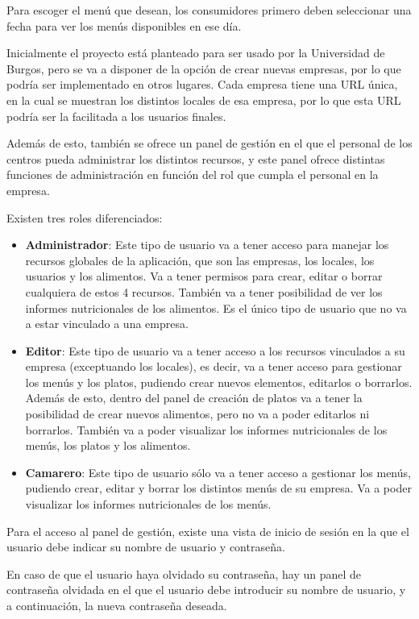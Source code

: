 Para escoger el menú que desean, los consumidores primero deben seleccionar una fecha para ver los menús disponibles en ese día.

Inicialmente el proyecto está planteado para ser usado por la Universidad de Burgos, pero se va a disponer de la opción de crear nuevas empresas, por lo que podría ser implementado en otros lugares. Cada empresa tiene una URL única, en la cual se muestran los distintos locales de esa empresa, por lo que esta URL podría ser la facilitada a los usuarios finales.

Además de esto, también se ofrece un panel de gestión en el que el personal de los centros pueda administrar los distintos recursos, y este panel ofrece distintas funciones de administración en función del rol que cumpla el personal en la empresa.

Existen tres roles diferenciados:

\begin{itemize}
	\item \textbf{Administrador}: Este tipo de usuario va a tener acceso para manejar los recursos globales de la aplicación, que son las empresas, los locales, los usuarios y los alimentos. Va a tener permisos para crear, editar o borrar cualquiera de estos 4 recursos. También va a tener posibilidad de ver los informes nutricionales de los alimentos. Es el único tipo de usuario que no va a estar vinculado a una empresa. 
	\item \textbf{Editor}: Este tipo de usuario va a tener acceso a los recursos vinculados a su empresa (exceptuando los locales), es decir, va a tener acceso para gestionar los menús y los platos, pudiendo crear nuevos elementos, editarlos o borrarlos. Además de esto, dentro del panel de creación de platos va a tener la posibilidad de crear nuevos alimentos, pero no va a poder editarlos ni borrarlos. También va a poder visualizar los informes nutricionales de los menús, los platos y los alimentos.
	\item \textbf{Camarero}: Este tipo de usuario sólo va a tener acceso a gestionar los menús, pudiendo crear, editar y borrar los distintos menús de su empresa. Va a poder visualizar los informes nutricionales de los menús.
\end{itemize}

Para el acceso al panel de gestión, existe una vista de inicio de sesión en la que el usuario debe indicar su nombre de usuario y contraseña. 

En caso de que el usuario haya olvidado su contraseña, hay un panel de contraseña olvidada en el que el usuario debe introducir su nombre de usuario, y a continuación, la nueva contraseña deseada.



